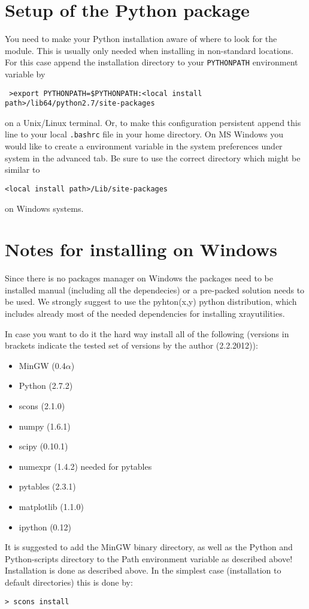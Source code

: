 \section{Setup of the Python package}

You need to make your Python installation aware of where to look for the module.
This is usually only needed when installing in non-standard {\tt<install path>} locations.
For this case append the installation directory to your {\tt PYTHONPATH} environment variable by 
\begin{verbatim}
 >export PYTHONPATH=$PYTHONPATH:<local install path>/lib64/python2.7/site-packages
\end{verbatim}
on a Unix/Linux terminal. Or, to make this configuration persistent append this line to
your local {\tt .bashrc} file in your home directory. 
On MS Windows you would like to create a environment variable in the 
system preferences under system in the advanced tab.
Be sure to use the correct directory which might be similar to 
\begin{verbatim}
<local install path>/Lib/site-packages
\end{verbatim}
on Windows systems.

\section{Notes for installing on Windows}

Since there is no packages manager on Windows the packages need to be installed manual 
(including all the dependecies) or a pre-packed solution needs to be used. We strongly suggest to
use the pyhton(x,y) python distribution, which includes already most of the needed dependencies for installing
xrayutilities.

In case you want to do it the hard way install all of the following (versions in brackets indicate the tested set of 
versions by the author (2.2.2012)):

\begin{itemize}
\item MinGW (0.4$\alpha$)
\item Python (2.7.2)
\item scons (2.1.0)
\item numpy (1.6.1)
\item scipy (0.10.1)
\item numexpr (1.4.2) needed for pytables
\item pytables (2.3.1)
\item matplotlib (1.1.0)
\item ipython (0.12)
\end{itemize}

It is suggested to add the MinGW binary directory, as well as the Python and Python-scripts directory
to the Path environment variable as described above! Installation is done as described above. 
In the simplest case (installation to default directories) this is done by:

\begin{verbatim}
> scons install
\end{verbatim}

